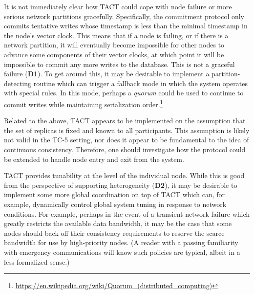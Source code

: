 It is not immediately clear how TACT could cope with node failure or more serious network partitions gracefully. Specifically, the commitment protocol only commits tentative writes whose timestamp is less than the minimal timestamp in the node's vector clock. This means that if a node is failing, or if there is a network partition, it will eventually become impossible for other nodes to advance some components of their vector clocks, at which point it will be impossible to commit any more writes to the database. This is not a graceful failure (\textbf{D1}). To get around this, it may be desirable to implement a partition-detecting routine which can trigger a fallback mode in which the system operates with special rules. In this mode, perhaps a \emph{quorum} could be used to continue to commit writes while maintaining serialization order.\footnote{ \url{https://en.wikipedia.org/wiki/Quorum_(distributed_computing)}}

Related to the above, TACT appears to be implemented on the assumption that the set of replicas is fixed and known to all participants. This assumption is likely not valid in the TC-5 setting, nor does it appear to be fundamental to the idea of continuous consistency. Therefore, one should investigate how the protocol could be extended to handle node entry and exit from the system.

TACT provides tunability at the level of the individual node. While this is good from the perspective of supporting heterogeneity (\textbf{D2}), it may be desirable to implement some more global coordination on top of TACT which can, for example, dynamically control global system tuning in response to network conditions. For example, perhaps in the event of a transient network failure which greatly restricts the available data bandwidth, it may be the case that some nodes should back off their consistency requirements to reserve the scarce bandwidth for use by high-priority nodes. (A reader with a passing familiarity with emergency communications will know such policies are typical, albeit in a less formalized sense.)

